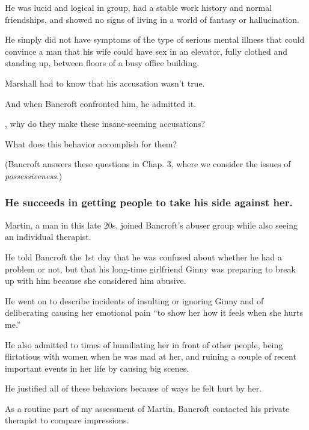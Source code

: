\documentclass[oneside]{article}
\numberwithin{equation}{section}
\begin{document}
He was lucid and logical in group, had a stable work history and normal friendships, and showed no signs of living in a world of fantasy or hallucination.

He simply did not have symptoms of the type of serious mental illness that could convince a man that his wife could have sex in an elevator, fully clothed and standing up, between floors of a busy office building.

Marshall had to know that his accusation wasn't true.

And when Bancroft confronted him, he admitted it.

%
, why do they make these insane-seeming accusations?


What does this behavior accomplish for them?

(Bancroft answers these questions in Chap. 3, where we consider the issues of \textit{possessiveness}.)

\subsubsection{He succeeds in getting people to take his side against her.}
Martin, a man in this late 20s, joined Bancroft's abuser group while also seeing an individual therapist.

He told Bancroft the 1st day that he was confused about whether he had a problem or not, but that his long-time girlfriend Ginny was preparing to break up with him because she considered him abusive.

He went on to describe incidents of insulting or ignoring Ginny and of deliberating causing her emotional pain ``to show her how it feels when she hurts me.''

He also admitted to times of humiliating her in front of other people, being flirtatious with women when he was mad at her, and ruining a couple of recent important events in her life by causing big scenes.

He justified all of these behaviors because of ways he felt hurt by her.

%
As a routine part of my assessment of Martin, Bancroft contacted his private therapist to compare impressions.
\end{document}
